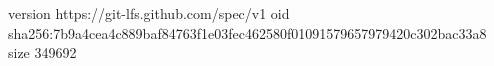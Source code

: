 version https://git-lfs.github.com/spec/v1
oid sha256:7b9a4cea4c889baf84763f1e03fec462580f01091579657979420c302bac33a8
size 349692
